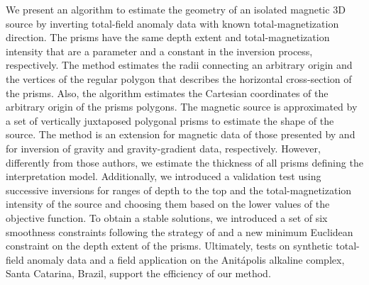 We present an algorithm to estimate the geometry of an isolated magnetic 3D source by inverting total-field anomaly data with known total-magnetization direction. The prisms have the same depth extent and total-magnetization intensity that are a parameter and a constant in the inversion process, respectively. The method estimates the radii connecting an arbitrary origin and the vertices of the regular polygon that describes the horizontal cross-section of the prisms. Also, the algorithm estimates the Cartesian coordinates of the arbitrary origin of the prisms polygons. The magnetic source is approximated by a set of vertically juxtaposed polygonal prisms to estimate the shape of the source. The method is an extension for magnetic data of those presented by \cite{oliveirajr-etal2011} and \cite{oliveirajr-barbosa2013} for inversion of gravity and gravity-gradient data, respectively. However, differently from those authors, we estimate the thickness of all prisms defining the interpretation model. Additionally, we introduced a validation test using successive inversions for ranges of depth to the top and the total-magnetization intensity of the source and choosing them based on the lower values of the objective function. To obtain a stable solutions, we introduced a set of six smoothness constraints following the strategy of \cite{oliveirajr-etal2011} and a new minimum Euclidean constraint on the depth extent of the prisms. Ultimately, tests on synthetic total-field anomaly data and a field application on the Anitápolis alkaline complex, Santa Catarina, Brazil, support the efficiency of our method.